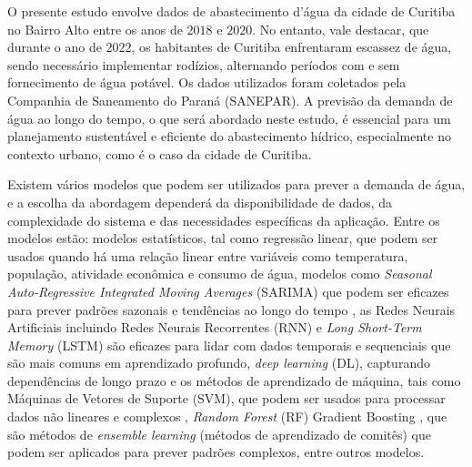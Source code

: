 O presente estudo envolve dados de abastecimento d'água da cidade de Curitiba no Bairro Alto entre os anos de $2018$ e $2020$. No entanto, vale destacar, que durante o ano de $2022$, os habitantes de Curitiba enfrentaram escassez de água, sendo necessário implementar rodízios, alternando períodos com e sem fornecimento de água potável. Os dados utilizados foram coletados pela Companhia de Saneamento do Paraná (SANEPAR). A previsão da demanda de água ao longo do tempo, o que será abordado neste estudo, é essencial para um planejamento sustentável e eficiente do abastecimento hídrico, especialmente no contexto urbano, como é o caso da cidade de Curitiba. 

Existem vários modelos que podem ser utilizados para prever a demanda de água, e a escolha da abordagem dependerá da disponibilidade de dados, da complexidade do sistema e das necessidades específicas da aplicação. Entre os modelos estão: modelos estatísticos, tal como regressão linear, que podem ser usados quando há uma relação linear entre variáveis como temperatura, população, atividade econômica e consumo de água, modelos como \textit{Seasonal Auto-Regressive Integrated Moving Averages} (SARIMA) que podem ser eficazes para prever padrões sazonais e tendências ao longo do tempo \cite{OLIVEIRA2017177}, as Redes Neurais Artificiais incluindo Redes Neurais Recorrentes (RNN) \cite{ASEERI2023101984} e \textit{Long Short-Term Memory} (LSTM) \cite{SABZIPOUR2023130380} são eficazes para lidar com dados temporais e sequenciais que são mais comuns em aprendizado profundo, \textit{deep learning} (DL), capturando dependências de longo prazo e os métodos de aprendizado de máquina, tais como Máquinas de Vetores de Suporte (SVM), que podem ser usados para processar dados não lineares e complexos \cite{CANDELIERI2019202}, \textit{Random Forest} (RF) \cite{ALI2023731} Gradient Boosting \cite{DONG2023105579}, que são métodos de \textit{ensemble learning} (métodos de aprendizado de comitês) que podem ser aplicados para prever padrões complexos, entre outros modelos.


